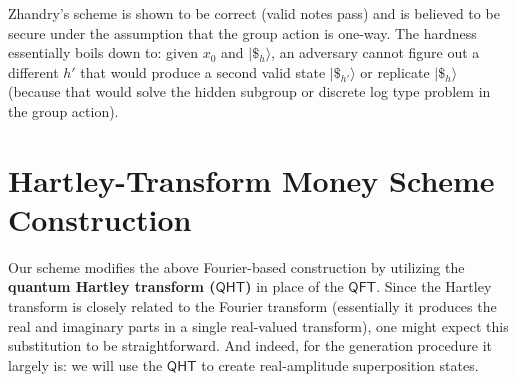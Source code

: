 \documentclass[12pt]{report}
\newcommand{\qht}{\mathsf{QHT}}
\newcommand{\qft}{\mathsf{QFT}}
\begin{document}
Zhandry’s scheme is shown to be correct (valid notes pass) and is believed to be secure under the assumption that the group action is one-way. The hardness essentially boils down to: given $x_0$ and $|\$_h\rangle$, an adversary cannot figure out a different $h'$ that would produce a second valid state $|\$_{h'}\rangle$ or replicate $|\$_h\rangle$ (because that would solve the hidden subgroup or discrete log type problem in the group action).

\section{Hartley-Transform Money Scheme Construction}


Our scheme modifies the above Fourier-based construction by utilizing the \textbf{quantum Hartley transform ($\qht$)} in place of the $\qft$. Since the Hartley transform is closely related to the Fourier transform (essentially it produces the real and imaginary parts in a single real-valued transform), one might expect this substitution to be straightforward. And indeed, for the generation procedure it largely is: we will use the $\qht$ to create real-amplitude superposition states.
\end{document}
